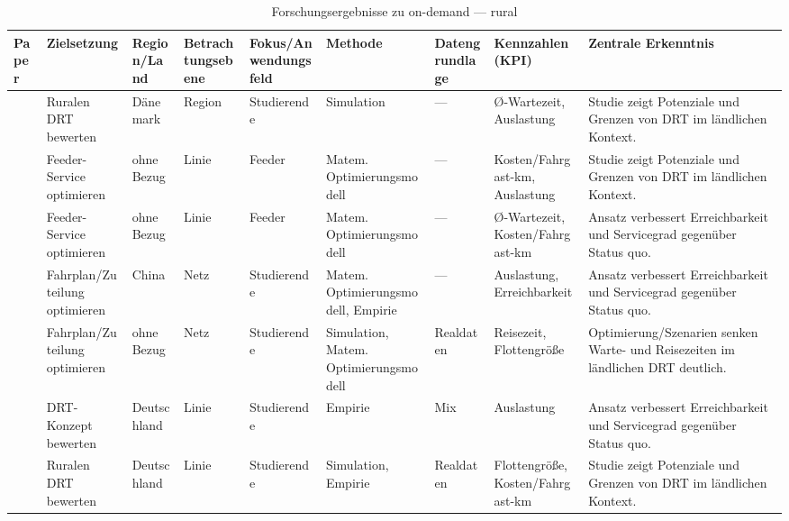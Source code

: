 \begin{table}[p]
\centering
\caption{Forschungsergebnisse zu on-demand — rural}
\label{tab:ondemand-rural-2}
\scriptsize
\setlength{\tabcolsep}{2.5pt}
\begin{tabularx}{\textwidth}{
  >{\RaggedRight\arraybackslash}p{2.8cm}
  >{\RaggedRight\arraybackslash}p{2.2cm}
  >{\RaggedRight\arraybackslash}p{1.8cm}
  >{\RaggedRight\arraybackslash}p{1.8cm}
  >{\RaggedRight\arraybackslash}p{2.0cm}
  >{\RaggedRight\arraybackslash}p{2.6cm}
  >{\RaggedRight\arraybackslash}p{1.8cm}
  >{\RaggedRight\arraybackslash}p{2.2cm}
  >{\RaggedRight\arraybackslash}X
}
\toprule
Paper & Zielsetzung & Region/Land & Betrachtungsebene & Fokus/Anwendungsfeld & Methode & Datengrundlage & Kennzahlen (KPI) & Zentrale Erkenntnis \\
\midrule

\textcite{} & Ruralen DRT bewerten & Dänemark & Region & Studierende & Simulation & — & Ø-Wartezeit, Auslastung & Studie zeigt Potenziale und Grenzen von DRT im ländlichen Kontext. \\ \hline

\textcite{galarza\_montenegro\_2021\_alargeneighborhood} & Feeder-Service optimieren & ohne Bezug & Linie & Feeder & Matem. Optimierungsmodell & — & Kosten/Fahrgast-km, Auslastung & Studie zeigt Potenziale und Grenzen von DRT im ländlichen Kontext. \\ \hline

\textcite{galarza\_montenegro\_2024\_ademandresponsivef} & Feeder-Service optimieren & ohne Bezug & Linie & Feeder & Matem. Optimierungsmodell & — & Ø-Wartezeit, Kosten/Fahrgast-km & Ansatz verbessert Erreichbarkeit und Servicegrad gegenüber Status quo. \\ \hline

\textcite{guo\_2023\_modularautonomouse} & Fahrplan/Zuteilung optimieren & China & Netz & Studierende & Matem. Optimierungsmodell, Empirie & — & Auslastung, Erreichbarkeit & Ansatz verbessert Erreichbarkeit und Servicegrad gegenüber Status quo. \\ \hline

\textcite{jiang\_2025\_integratedoptimiza} & Fahrplan/Zuteilung optimieren & ohne Bezug & Netz & Studierende & Simulation, Matem. Optimierungsmodell & Realdaten & Reisezeit, Flottengröße & Optimierung/Szenarien senken Warte- und Reisezeiten im ländlichen DRT deutlich. \\ \hline

\textcite{knierim\_2021\_theattitudeofpoten} & DRT-Konzept bewerten & Deutschland & Linie & Studierende & Empirie & Mix & Auslastung & Ansatz verbessert Erreichbarkeit und Servicegrad gegenüber Status quo. \\ \hline

\textcite{lu\_2023\_demandresponsivetr} & Ruralen DRT bewerten & Deutschland & Linie & Studierende & Simulation, Empirie & Realdaten & Flottengröße, Kosten/Fahrgast-km & Studie zeigt Potenziale und Grenzen von DRT im ländlichen Kontext. \\ \hline

\bottomrule
\end{tabularx}
\end{table}
